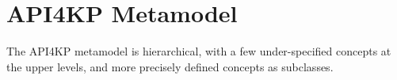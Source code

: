 \documentclass[runningheads]{llncs}
\begin{document}
%




\section{API4KP Metamodel}
\label{sec:metamodel}
The API4KP metamodel is hierarchical, with a few under-specified concepts at the upper levels, and more precisely defined concepts as subclasses.
\end{document}
